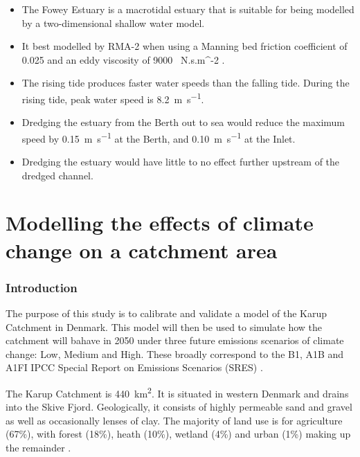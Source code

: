 \documentclass{article}
\begin{document}
\begin{itemize}
    \item The Fowey Estuary is a macrotidal estuary that is suitable for being modelled by a two-dimensional shallow water model.
    \item It best modelled by RMA-2 when using a Manning bed friction coefficient of 0.025 and an eddy viscosity of \SI{9000}{ N.s.m^{-2} }.
    \item The rising tide produces faster water speeds than the falling tide. During the rising tide, peak water speed is \SI{8.2}{m.s^{-1}}.
    \item Dredging the estuary from the Berth out to sea would reduce the maximum speed by \SI{0.15}{m.s^{-1}} at the Berth, and \SI{0.10}{m.s^{-1}} at the Inlet.
    \item Dredging the estuary would have little to no effect further upstream of the dredged channel.
\end{itemize}

\printbibliography[filter=practical1]

\newpage
\setcounter{section}{0}
\setcounter{figure}{0}

\part*{Modelling the effects of climate change on a catchment area}

\section{Introduction}

The purpose of this study is to calibrate and validate a model of the Karup Catchment in Denmark. This model will then be used to simulate how the catchment will bahave in 2050 under three future emissions scenarios of climate change: Low, Medium and High. These broadly correspond to the B1, A1B and A1FI IPCC Special Report on Emissions Scenarios (SRES) \parencite{ipcc2000special}.

The Karup Catchment is \SI{440}{km^2}. It is situated in western Denmark and drains into the Skive Fjord. Geologically, it consists of highly permeable sand and gravel as well as occasionally lenses of clay. 
The majority of land use is for agriculture (67\%), with forest (18\%), heath (10\%), wetland (4\%) and urban (1\%) making up the remainder \parencite{refsgaard1997parameterisation}.
\end{document}
